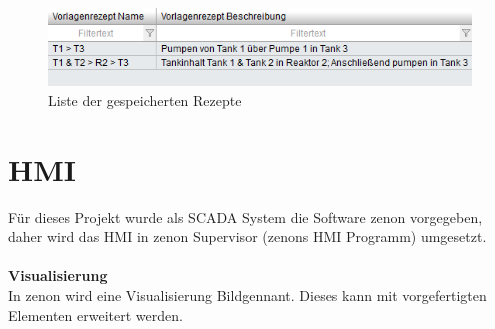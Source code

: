 \begin{figure}[h!]
  \centering
  \includegraphics[width=1\textwidth]{graphics/implementation/rezepte_liste}
  \caption{Liste der gespeicherten Rezepte}
  \label{fig:rezepte_list}
\end{figure}
	
\section{HMI}
Für dieses Projekt wurde als SCADA System die Software zenon vorgegeben, daher wird das HMI in zenon Supervisor (zenons HMI Programm) umgesetzt.\\
\\
\textbf{Visualisierung}\\
In zenon wird eine Visualisierung \glqq Bild\grqq\space  gennant. Dieses kann mit vorgefertigten Elementen erweitert werden. 


